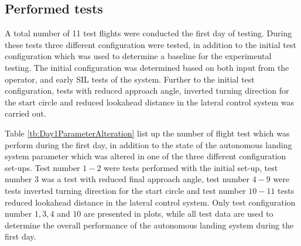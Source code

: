 \subsection{Performed tests}
A total number of 11 test flights were conducted the first day of testing. During these tests three different configuration were tested, in addition to the initial test configuration which was used to determine a baseline for the experimental testing. The initial configuration was determined based on both input from the operator, and early SIL tests of the system. Further to the initial test configuration, tests with reduced approach angle, inverted turning direction for the start circle and reduced lookahead distance in the lateral control system was carried out.

Table \ref{tb:Day1ParameterAlteration} list up the number of flight test which was perform during the first day, in addition to the state of the autonomous landing system parameter which was altered in one of the three different configuration set-ups. Test number $1-2$ were tests performed with the initial set-up, test number $3$ was a test with reduced final approach angle, test number $4-9$ were tests inverted turning direction for the start circle and test number $10-11$ tests reduced lookahead distance in the lateral control system.  Only test configuration number $1,3,4$ and $10$ are presented in plots, while all test data are used to determine the overall performance of the autonomous landing system during the first day.
\newpage
